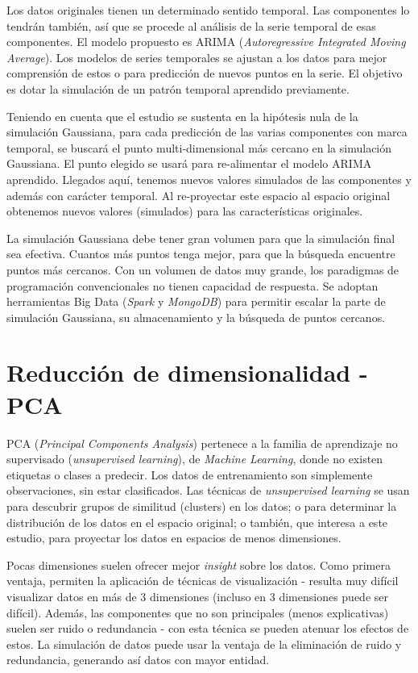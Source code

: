 \documentclass[11pt,spanish,listoffigures,listoftables]{tfgetsinf}
\begin{document}
Los datos originales tienen un determinado sentido temporal. Las componentes lo tendrán también, así que se procede al análisis de la serie temporal de esas componentes. El modelo propuesto es ARIMA ({\em Autoregressive Integrated Moving Average}). Los modelos de series temporales se ajustan a los datos para mejor comprensión de estos o para predicción de nuevos puntos en la serie. El objetivo es dotar la simulación de un patrón temporal aprendido previamente.

Teniendo en cuenta que el estudio se sustenta en la hipótesis nula de la simulación Gaussiana, para cada predicción de las varias componentes con marca temporal, se buscará el punto multi-dimensional más cercano en la simulación Gaussiana. El punto elegido se usará para re-alimentar el modelo ARIMA aprendido. Llegados aquí, tenemos nuevos valores simulados de las componentes y además con carácter temporal. Al re-proyectar este espacio al espacio original obtenemos nuevos valores (simulados) para las características originales.

La simulación Gaussiana debe tener gran volumen para que la simulación final sea efectiva. Cuantos más puntos tenga mejor, para que la búsqueda encuentre puntos más cercanos. Con un volumen de datos muy grande, los paradigmas de programación convencionales no tienen capacidad de respuesta. Se adoptan herramientas Big Data ({\em Spark} y {\em MongoDB}) para permitir escalar la parte de simulación Gaussiana, su almacenamiento y la búsqueda de puntos cercanos.


    \section{Reducción de dimensionalidad - PCA}
    PCA ({\em Principal Components Analysis}) pertenece a la familia de aprendizaje no supervisado ({\em unsupervised learning}), de {\em Machine Learning}, donde no existen etiquetas o clases a predecir. Los datos de entrenamiento son simplemente observaciones, sin estar clasificados. Las técnicas de {\em unsupervised learning} se usan para descubrir grupos de similitud (clusters) en los datos; o para determinar la distribución de los datos en el espacio original; o también, que interesa a este estudio, para proyectar los datos en espacios de menos dimensiones.

    Pocas dimensiones suelen ofrecer mejor {\em insight} sobre los datos. Como primera ventaja, permiten la aplicación de técnicas de visualización - resulta muy difícil visualizar datos en más de 3 dimensiones (incluso en 3 dimensiones puede ser difícil). Además, las componentes que no son principales (menos explicativas) suelen ser ruido o redundancia - con esta técnica se pueden atenuar los efectos de estos. La simulación de datos puede usar la ventaja de la eliminación de ruido y redundancia, generando así datos con mayor entidad.
    
\end{document}
